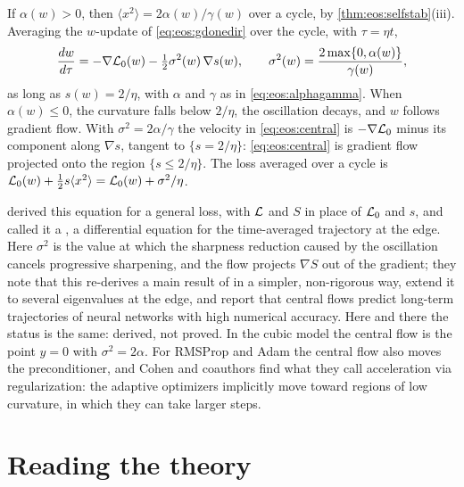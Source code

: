 \begin{refsection}
\begin{heuristic}
If $\alpha(w)>0$, then $\langle x^2\rangle=2\alpha(w)/\gamma(w)$ over a cycle, by \cref{thm:eos:selfstab}(iii). Averaging the $w$-update of \eqref{eq:eos:gdonedir} over the cycle, with $\tau=\eta t$,
\begin{equation}\label{eq:eos:central}
  \frac{dw}{d\tau}=-\nabla\mathcal{L}_0(w)-\tfrac12\sigma^2(w)\,\nabla s(w),\qquad
  \sigma^2(w)=\frac{2\max\{0,\alpha(w)\}}{\gamma(w)},
\end{equation}
as long as $s(w)=2/\eta$, with $\alpha$ and $\gamma$ as in \eqref{eq:eos:alphagamma}. When $\alpha(w)\le0$, the curvature falls below $2/\eta$, the oscillation decays, and $w$ follows gradient flow. With $\sigma^2=2\alpha/\gamma$ the velocity in \eqref{eq:eos:central} is $-\nabla\mathcal{L}_0$ minus its component along $\nabla s$, tangent to $\{s=2/\eta\}$: \eqref{eq:eos:central} is gradient flow projected onto the region $\{s\le2/\eta\}$. The loss averaged over a cycle is $\mathcal{L}_0(w)+\frac12s\langle x^2\rangle=\mathcal{L}_0(w)+\sigma^2/\eta$.
\end{heuristic}

\Textcite{CohenEtAl2025} derived this equation for a general loss, with $\mathcal{L}$ and $S$ in place of $\mathcal{L}_0$ and $s$, and called it a , a differential equation for the time-averaged trajectory at the edge. Here $\sigma^2$ is the value at which the sharpness reduction caused by the oscillation cancels progressive sharpening, and the flow projects $\nabla S$ out of the gradient; they note that this re-derives a main result of \textcite{DamianNichaniLee2023} in a simpler, non-rigorous way, extend it to several eigenvalues at the edge, and report that central flows predict long-term trajectories of neural networks with high numerical accuracy. Here and there the status is the same: derived, not proved. In the cubic model the central flow is the point $y=0$ with $\sigma^2=2\alpha$. For RMSProp and Adam the central flow also moves the preconditioner, and Cohen and coauthors find what they call acceleration via regularization: the adaptive optimizers implicitly move toward regions of low curvature, in which they can take larger steps.

\section{Reading the theory}\label{sec:eos:reading}


\end{refsection}
